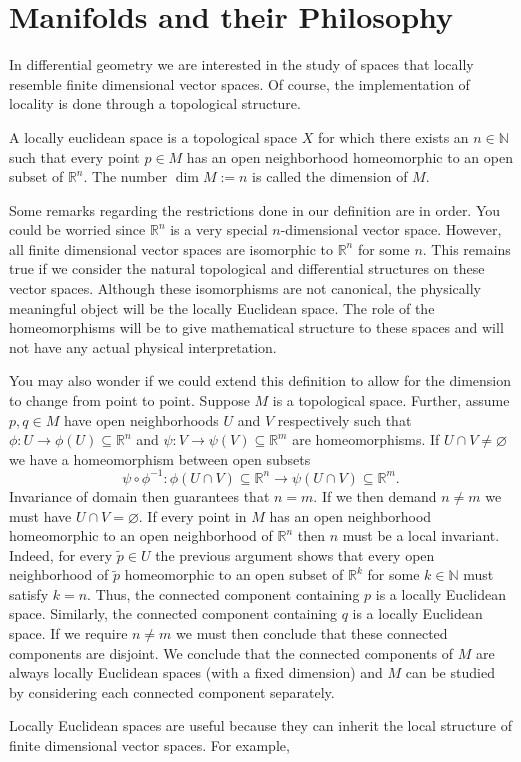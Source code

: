 \section{Manifolds and their Philosophy}

In differential geometry we are interested in the study of spaces that locally resemble finite dimensional vector spaces. Of course, the implementation of locality is done through a topological structure. 

\begin{definition}

	A locally euclidean space is a topological space $X$ for which there exists an $n\in\mathbb{N}$ such that every point $p\in M$ has an open neighborhood homeomorphic to an open subset of $\mathbb{R}^n$. The number $\dim M:=n$ is called the dimension of $M$.

\end{definition}

Some remarks regarding the restrictions done in our definition are in order. You could be worried since $\mathbb{R}^n$ is a very special $n$-dimensional vector space. However, all finite dimensional vector spaces are isomorphic to $\mathbb{R}^n$ for some $n$. This remains true if we consider the natural topological and differential structures on these vector spaces. Although these isomorphisms are not canonical, the physically meaningful object will be the locally Euclidean space. The role of the homeomorphisms will be to give mathematical structure to these spaces and will not have any actual physical interpretation.

You may also wonder if we could extend this definition to allow for the dimension to change from point to point. Suppose $M$ is a topological space. Further, assume $p,q\in M$ have open neighborhoods $U$ and $V$ respectively such that $\phi:U\rightarrow\phi(U)\subseteq\mathbb{R}^n$ and $\psi:V\rightarrow\psi(V)\subseteq\mathbb{R}^m$ are homeomorphisms. If $U\cap V\neq\varnothing$ we have a homeomorphism between open subsets 
\begin{equation}
\psi\circ\phi^{-1}:\phi(U\cap V)\subseteq\mathbb{R}^n\rightarrow \psi(U\cap V)\subseteq\mathbb{R}^m.
\end{equation}
Invariance of domain then guarantees that $n=m$. If we then demand $n\neq m$ we must have $U\cap V=\varnothing$. If every point in $M$ has an open neighborhood homeomorphic to an open neighborhood of $\mathbb{R}^n$ then $n$ must be a local invariant. Indeed, for every $\tilde{p}\in U$ the previous argument shows that every open neighborhood of $\tilde{p}$ homeomorphic to an open subset of $\mathbb{R}^k$ for some $k\in\mathbb{N}$ must satisfy $k=n$. Thus, the connected component containing $p$ is a locally Euclidean space. Similarly, the connected component containing $q$ is a locally Euclidean space. If we require $n\neq m$ we must then conclude that these connected components are disjoint. We conclude that the connected components of $M$ are always locally Euclidean spaces (with a fixed dimension) and $M$ can be studied by considering each connected component separately.

Locally Euclidean spaces are useful because they can inherit the local structure of finite dimensional vector spaces. For example, 

 